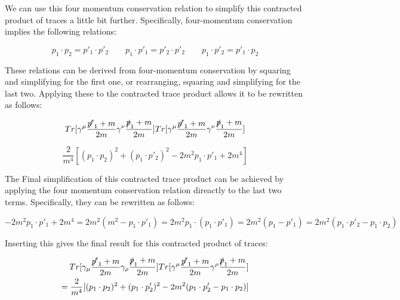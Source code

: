 \documentclass[a4]{article}
\begin{document}
    We can use this four momentum conservation relation to simplify this contracted product of traces a little bit further. Specifically, four-momentum conservation implies the following relations:

    \begin{equation}
        p_1 \cdot p_2 = p'_1 \cdot p'_2 \qquad p_1 \cdot p'_1 = p'_2 \cdot p'_2 \qquad p_1 \cdot p'_2 = p'_1 \cdot p_2
    \end{equation}

    These relations can be derived from four-momentum conservation by squaring and simplifying for the first one, or rearranging, squaring and simplifying for the last two. Applying these to the contracted trace product allows it to be rewritten as follows:

    \begin{equation}
        Tr [\gamma^\mu \frac{\slashed{p'}_1 + m}{2m} \gamma^\nu \frac{\slashed{p}_1 + m}{2 m}] Tr [\gamma^\mu \frac{\slashed{p'}_1 + m}{2m} \gamma^\nu \frac{\slashed{p}_1 + m}{2 m}]
    \end{equation}

    \begin{equation}
        \frac{2}{m^4} [(p_1 \cdot p_2)^2 + (p_1 \cdot p'_2)^2 - 2 m^2 p_1 \cdot p'_1 + 2 m^4]
    \end{equation}

    The Final simplification of this contracted trace product can be achieved by applying the four momentum conservation relation direactly to the last two terms. Specifically, they can be rewritten as follows:

    \begin{equation}
        -2 m^2 p_1 \cdot p'_1 + 2 m^4 = 2 m^2 (m^2 - p_1 \cdot p'_1) = 2 m^2 p_1 \cdot (p_1 \cdot p'_1) = 2 m^2 (p_1 - p'_1) = 2 m^2 (p_1 \cdot p'_2 - p_1 \cdot p_2)
    \end{equation}

    Inserting this gives the final result for this contracted product of traces:

    \begin{framed}
        \begin{equation}
            \begin{aligned}
                Tr [\gamma_\mu \frac{\slashed{p'}_1 + m}{2m} \gamma_\rho \frac{\slashed{p}_1 + m}{2 m}] Tr [\gamma^\mu \frac{\slashed{p'}_1 + m}{2m} \gamma^\rho \frac{\slashed{p}_1 + m}{2 m}] \\
                = \frac{2}{m^4} [(p_1 \cdot p_2)^2 + (p_1 \cdot p'_2)^2 - 2 m^2 (p_1 \cdot p'_2 - p_1 \cdot p_2)]
            \end{aligned}
        \end{equation}
    \end{framed}
\end{document}
